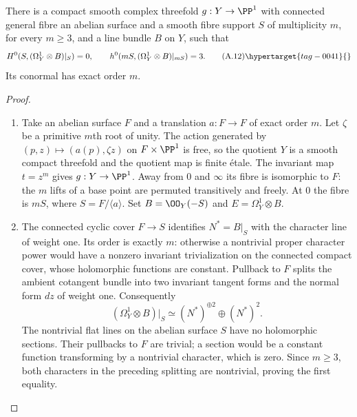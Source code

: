 \begin{proposition}\hypertarget{tag-01AM}{}\label{cdp:st:A.3.2}

There is a compact smooth complex threefold $g:Y\to\PP^1$ with connected general fibre an abelian surface and a smooth fibre support $S$ of multiplicity $m$, for every $m\ge3$, and a line bundle $B$ on $Y$, such that
\[
H^0(S,(\Omega_Y^1\otimes B)|_S)=0,
\qquad h^0(mS,(\Omega_Y^1\otimes B)|_{mS})=3.
\tag{A.12}\hypertarget{tag-0041}{}\label{cdp:eq:A.12}
\]
Its conormal has exact order $m$.
\end{proposition}


\begin{proof}

\begin{enumerate}[label={$\langle1\rangle$\arabic*.},leftmargin=*]
\item Take an abelian surface $F$ and a translation $a:F\to F$ of exact order $m$. Let $\zeta$ be a primitive $m$th root of unity. The action generated by $(p,z)\mapsto(a(p),\zeta z)$ on $F\times\PP^1$ is free, so the quotient $Y$ is a smooth compact threefold and the quotient map is finite \'etale. The invariant map $t=z^m$ gives $g:Y\to\PP^1$. Away from $0$ and $\infty$ its fibre is isomorphic to $F$: the $m$ lifts of a base point are permuted transitively and freely. At $0$ the fibre is $mS$, where $S=F/\langle a\rangle$. Set $B=\OO_Y(-S)$ and $E=\Omega_Y^1\otimes B$.

\item The connected cyclic cover $F\to S$ identifies $N^*=B|_S$ with the character line of weight one. Its order is exactly $m$: otherwise a nontrivial proper character power would have a nonzero invariant trivialization on the connected compact cover, whose holomorphic functions are constant. Pullback to $F$ splits the ambient cotangent bundle into two invariant tangent forms and the normal form $dz$ of weight one. Consequently
\[
 (\Omega_Y^1\otimes B)|_S\simeq (N^*)^{\oplus2}\oplus(N^*)^2.
\]
The nontrivial flat lines on the abelian surface $S$ have no holomorphic sections. Their pullbacks to $F$ are trivial; a section would be a constant function transforming by a nontrivial character, which is zero. Since $m\ge3$, both characters in the preceding splitting are nontrivial, proving the first equality.


\end{enumerate}
\end{proof}
